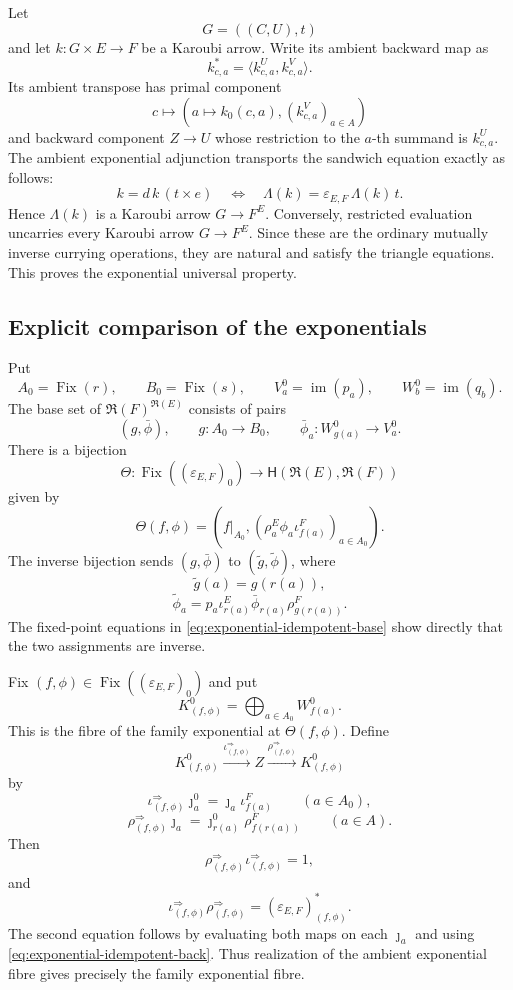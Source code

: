 \documentclass[runningheads,envcountsame]{llncs}
\newcommand{\Fix}{\operatorname{Fix}}
\newcommand{\im}{\operatorname{im}}
\newcommand{\Rlz}{\mathfrak R}
\begin{document}
Let
$$
G=((C,U),t)
$$
and let $k:G\times E\to F$ be a Karoubi arrow. Write its ambient backward
map as
$$
k_{c,a}^*=\langle k^U_{c,a},k^V_{c,a}\rangle.
$$
Its ambient transpose has primal component
$$
c\longmapsto
\left(
 a\longmapsto k_0(c,a),
 (k^V_{c,a})_{a\in A}
\right)
$$
and backward component $Z\to U$ whose restriction to the $a$-th summand is
$k^U_{c,a}$. The ambient exponential adjunction transports the sandwich
equation exactly as follows:
$$
k=d\,k\,(t\times e)
\quad\Longleftrightarrow\quad
\Lambda(k)=\varepsilon_{E,F}\,\Lambda(k)\,t.
$$
Hence $\Lambda(k)$ is a Karoubi arrow $G\to F^E$. Conversely, restricted
evaluation uncarries every Karoubi arrow $G\to F^E$. Since these are the
ordinary mutually inverse currying operations, they are natural and satisfy
the triangle equations. This proves the exponential universal property.

\subsection{Explicit comparison of the exponentials}

Put
$$
A_0=\Fix(r),
\qquad
B_0=\Fix(s),
\qquad
V_a^0=\im(p_a),
\qquad
W_b^0=\im(q_b).
$$
The base set of $\Rlz(F)^{\Rlz(E)}$ consists of pairs
$$
(g,\bar\phi),
\qquad
g:A_0\to B_0,
\qquad
\bar\phi_a:W_{g(a)}^0\to V_a^0.
$$
There is a bijection
\begin{equation}
\Theta:
\Fix((\varepsilon_{E,F})_0)
\longrightarrow
\mathsf H(\Rlz(E),\Rlz(F))
\label{eq:exponential-base-comparison}
\end{equation}
given by
$$
\Theta(f,\phi)
=
\left(
 f|_{A_0},
 (\rho_a^E\phi_a\iota_{f(a)}^F)_{a\in A_0}
\right).
$$
The inverse bijection sends $(g,\bar\phi)$ to
$(\widetilde g,\widetilde\phi)$, where
$$
\widetilde g(a)=g(r(a)),
$$
$$
\widetilde\phi_a
=
p_a\iota_{r(a)}^E
\bar\phi_{r(a)}
\rho_{g(r(a))}^F.
$$
The fixed-point equations in
\eqref{eq:exponential-idempotent-base} show directly that the two assignments
are inverse.

Fix $(f,\phi)\in\Fix((\varepsilon_{E,F})_0)$ and put
$$
K_{(f,\phi)}^0
=
\bigoplus_{a\in A_0}W_{f(a)}^0.
$$
This is the fibre of the family exponential at $\Theta(f,\phi)$. Define
$$
K_{(f,\phi)}^0
\xrightarrow{\iota_{(f,\phi)}^{\Rightarrow}}
Z
\xrightarrow{\rho_{(f,\phi)}^{\Rightarrow}}
K_{(f,\phi)}^0
$$
by
$$
\iota_{(f,\phi)}^{\Rightarrow}\jmath_a^0
=
\jmath_a\iota_{f(a)}^F
\qquad(a\in A_0),
$$
$$
\rho_{(f,\phi)}^{\Rightarrow}\jmath_a
=
\jmath_{r(a)}^0\rho_{f(r(a))}^F
\qquad(a\in A).
$$
Then
$$
\rho_{(f,\phi)}^{\Rightarrow}
\iota_{(f,\phi)}^{\Rightarrow}=1,
$$
and
$$
\iota_{(f,\phi)}^{\Rightarrow}
\rho_{(f,\phi)}^{\Rightarrow}
=(\varepsilon_{E,F})^*_{(f,\phi)}.
$$
The second equation follows by evaluating both maps on each $\jmath_a$ and
using \eqref{eq:exponential-idempotent-back}. Thus realization of the
ambient exponential fibre gives precisely the family exponential fibre.
\end{document}
